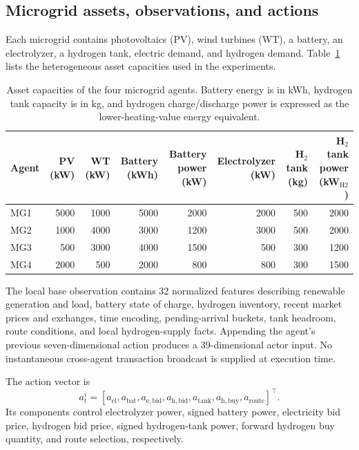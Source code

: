 \documentclass[final,5p,times]{elsarticle}
\begin{document}
\subsection{Microgrid assets, observations, and actions}

Each microgrid contains photovoltaics (PV), wind turbines (WT), a battery, an electrolyzer, a hydrogen tank, electric demand, and hydrogen demand. Table~\ref{tab:assets} lists the heterogeneous asset capacities used in the experiments.

\begin{table}[t]
\centering
\caption{Asset capacities of the four microgrid agents. Battery energy is in kWh, hydrogen tank capacity is in kg, and hydrogen charge/discharge power is expressed as the lower-heating-value energy equivalent.}
\label{tab:assets}
\small
\begin{tabular}{lrrrrrrr}
\toprule
Agent & PV (kW) & WT (kW) & Battery (kWh) & Battery power (kW) & Electrolyzer (kW) & H$_2$ tank (kg) & H$_2$ tank power (kW$_{\mathrm{H2}}$)\\
\midrule
MG1 & 5000 & 1000 & 5000 & 2000 & 2000 & 500 & 2000\\
MG2 & 1000 & 4000 & 3000 & 1200 & 3000 & 500 & 2000\\
MG3 &  500 & 3000 & 4000 & 1500 &  500 & 300 & 1200\\
MG4 & 2000 &  500 & 2000 &  800 &  800 & 300 & 1500\\
\bottomrule
\end{tabular}
\end{table}

The local base observation contains 32 normalized features describing renewable generation and load, battery state of charge, hydrogen inventory, recent market prices and exchanges, time encoding, pending-arrival buckets, tank headroom, route conditions, and local hydrogen-supply facts. Appending the agent's previous seven-dimensional action produces a 39-dimensional actor input. No instantaneous cross-agent transaction broadcast is supplied at execution time.

The action vector is
\begin{equation}
 a_t^i=[a_{\mathrm{el}},a_{\mathrm{bat}},a_{\mathrm{e,bid}},a_{\mathrm{h,bid}},
 a_{\mathrm{tank}},a_{\mathrm{h,buy}},a_{\mathrm{route}}]^{\top}.
\end{equation}
Its components control electrolyzer power, signed battery power, electricity bid price, hydrogen bid price, signed hydrogen-tank power, forward hydrogen buy quantity, and route selection, respectively.
\end{document}
